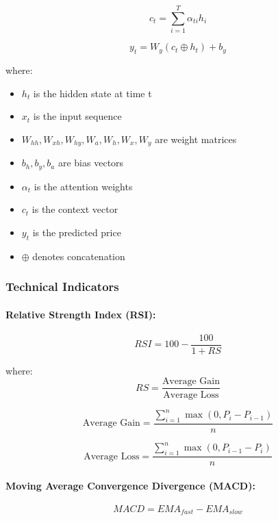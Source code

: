 \documentclass[conference]{IEEEtran}
\begin{document}
\begin{equation}
c_t = \sum_{i=1}^T \alpha_{ti} h_i
\end{equation}

\begin{equation}
y_t = W_y(c_t \oplus h_t) + b_y
\end{equation}

where:
\begin{itemize}
    \item $h_t$ is the hidden state at time t
    \item $x_t$ is the input sequence
    \item $W_{hh}, W_{xh}, W_{hy}, W_a, W_h, W_x, W_y$ are weight matrices
    \item $b_h, b_y, b_a$ are bias vectors
    \item $\alpha_t$ is the attention weights
    \item $c_t$ is the context vector
    \item $y_t$ is the predicted price
    \item $\oplus$ denotes concatenation
\end{itemize}

\subsubsection{Technical Indicators}

\paragraph{Relative Strength Index (RSI):}
\begin{equation}
RSI = 100 - \frac{100}{1 + RS}
\end{equation}

where:
\begin{equation}
RS = \frac{\text{Average Gain}}{\text{Average Loss}}
\end{equation}

\begin{equation}
\text{Average Gain} = \frac{\sum_{i=1}^n \max(0, P_i - P_{i-1})}{n}
\end{equation}

\begin{equation}
\text{Average Loss} = \frac{\sum_{i=1}^n \max(0, P_{i-1} - P_i)}{n}
\end{equation}

\paragraph{Moving Average Convergence Divergence (MACD):}
\begin{equation}
MACD = EMA_{fast} - EMA_{slow}
\end{equation}
\end{document}
